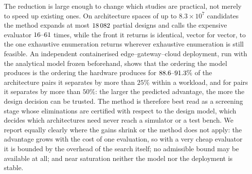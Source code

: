 The reduction is large enough to change which studies are practical, not merely to speed up existing ones. On
architecture spaces of up to $8.3\times10^{7}$ candidates the method expands at most
$18\,082$ partial designs and calls the expensive evaluator $16\text{--}61$ times, while the
front it returns is identical, vector for vector, to the one exhaustive enumeration
returns wherever exhaustive enumeration is still feasible. An independent containerised
edge--gateway--cloud deployment, run with the analytical model frozen beforehand, shows
that the ordering the model produces is the ordering the hardware produces for
$88.6\text{--}91.3\%$ of the architecture pairs it separates by more than $25\%$
within a workload, and for \ReliabilityFifty{} pairs it separates by more than $50\%$:
the larger the predicted advantage, the more the design decision can be trusted. The
method is therefore best read as a screening stage whose eliminations are certified with
respect to the design model, which decides which architectures need never reach a
simulator or a test bench. We report equally clearly where the gains shrink or the method does not apply: the
advantage grows with the cost of one evaluation, so with a very cheap evaluator it is
bounded by the overhead of the search itself; no admissible bound may be available at
all; and near saturation neither the model nor the deployment is stable.
